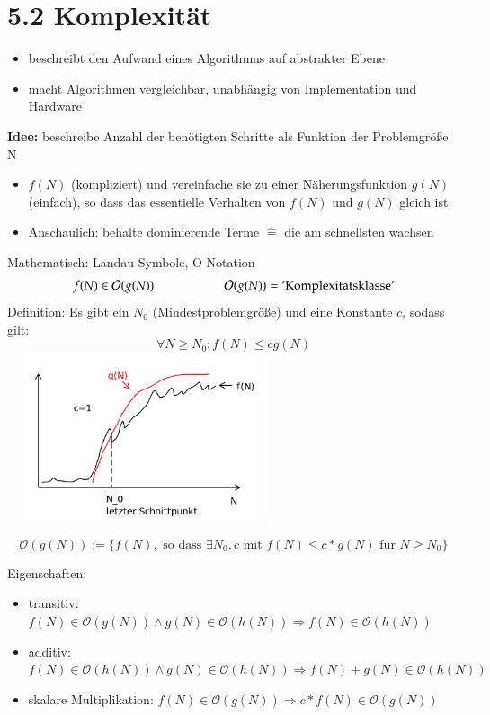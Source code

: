 \documentclass[11pt, fleqn]{scrreprt}
\begin{document}
\section*{5.2 Komplexität}
\begin{itemize}
	\item beschreibt den Aufwand eines Algorithmus auf abstrakter Ebene
	\item macht Algorithmen vergleichbar, unabhängig von Implementation und Hardware
\end{itemize}
\textbf{Idee:} beschreibe Anzahl der benötigten Schritte als Funktion der Problemgröße N
\begin{itemize}[label={}]
	\item $f(N)$ (kompliziert) und vereinfache sie zu einer Näherungsfunktion $g(N)$ (einfach), so dass das essentielle Verhalten von $f(N)$ und $g(N)$ gleich ist.
	\item Anschaulich: behalte dominierende Terme $\widehat{=}$ die am schnellsten wachsen
\end{itemize}
Mathematisch: Landau-Symbole, \glqq O-Notation\grqq \\
\[f(N) \in \mathcal O(g(N)) \hspace*{2cm} \mathcal O(g(N)) = \text{'Komplexitätsklasse'}\]
Definition: Es gibt ein $N_0$ (Mindestproblemgröße) und eine Konstante $c$, sodass gilt: 
\[\forall N \geq N_0: f(N) \leq c g(N)\]
\includegraphics[width=8cm,height=5cm,keepaspectratio]{./Pictures/Komplexitaet.png}

\[\mathcal O(g(N)) := \biggl\lbrace f(N), \text{ so dass } \exists N_0, c \text{ mit } f(N) \leq c * g(N) \text{ für } N \geq N_0 \biggr\rbrace\]

Eigenschaften:
\begin{itemize}
	\item transitiv: $f(N) \in \mathcal O(g(N)) \land g(N) \in \mathcal O(h(N)) \Rightarrow f(N) \in \mathcal O(h(N))$
	\item additiv: $f(N) \in \mathcal O(h(N)) \land g(N) \in \mathcal O(h(N)) \Rightarrow f(N) + g(N) \in \mathcal O(h(N))$
	\item skalare Multiplikation: $f(N) \in \mathcal O(g(N)) \Rightarrow c* f(N) \in \mathcal O(g(N)) $
\end{itemize}
\end{document}
